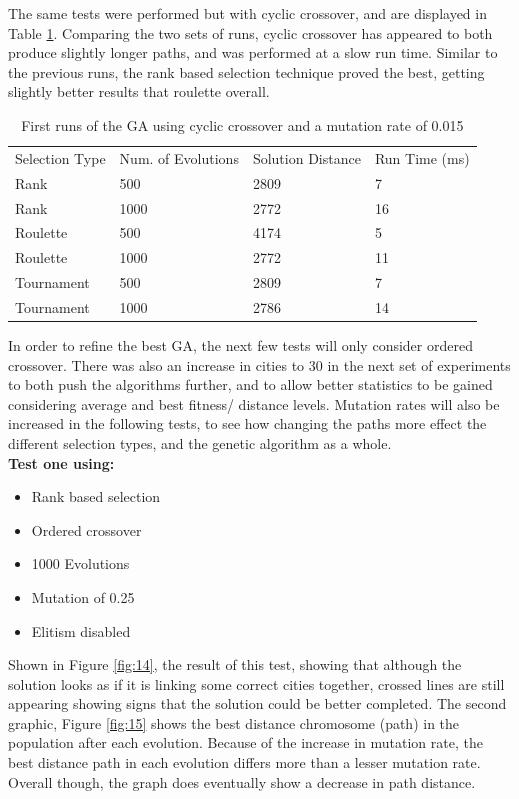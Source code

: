 \documentclass[article]{IEEEtran}
\begin{document}
The same tests were performed but with cyclic crossover, and are displayed in Table \ref{tab:2}. Comparing the two sets of runs, cyclic crossover has appeared to both produce slightly longer paths, and was performed at a slow run time. Similar to the previous runs, the rank based selection technique proved the best, getting slightly better results that roulette overall.

\begin{table}[H]
\centering
\caption{First runs of the GA using cyclic crossover and a mutation rate of 0.015}
\label{tab:2}
\begin{tabular}{llll}
Selection Type & Num. of Evolutions & Solution Distance & Run Time (ms) \\
Rank & 500 & 2809 & 7 \\
Rank & 1000 & 2772 & 16 \\
Roulette & 500 & 4174 & 5 \\
Roulette & 1000 & 2772 & 11 \\
Tournament & 500 & 2809 & 7 \\
Tournament & 1000 & 2786 & 14 
\end{tabular}
\end{table}

In order to refine the best GA, the next few tests will only consider ordered crossover. There was also an increase in cities to 30 in the next set of experiments to both push the algorithms further, and to allow better statistics to be gained considering average and best fitness/ distance levels. Mutation rates will also be increased in the following tests, to see how changing the paths more effect the different selection types, and the genetic algorithm as a whole.\\

\textbf{Test one using:} 
\begin{itemize}
\item Rank based selection
\item Ordered crossover
\item 1000 Evolutions
\item Mutation of 0.25
\item Elitism disabled
\end{itemize} 

Shown in Figure \ref{fig:14}, the result of this test, showing that although the solution looks as if it is linking some correct cities together, crossed lines are still appearing showing signs that the solution could be better completed. The second graphic, Figure \ref{fig:15} shows the best distance chromosome (path) in the population after each evolution. Because of the increase in mutation rate, the best distance path in each evolution differs more than a lesser mutation rate. Overall though, the graph does eventually show a decrease in path distance.
\end{document}
